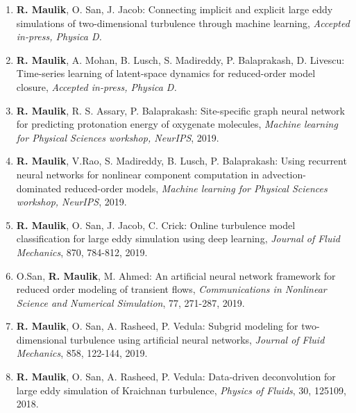 \documentclass[letterpaper]{article}
\begin{document}
\begin{enumerate}

\item \textbf{R. Maulik}, O. San, J. Jacob: Connecting implicit and explicit large eddy simulations of two-dimensional turbulence through machine learning, {\it Accepted in-press, Physica D.}

\item \textbf{R. Maulik}, A. Mohan, B. Lusch, S. Madireddy, P. Balaprakash, D. Livescu: Time-series learning of latent-space dynamics for reduced-order model closure, {\it Accepted in-press, Physica D.}

\item \textbf{R. Maulik}, R. S. Assary, P. Balaprakash: Site-specific graph neural network for predicting protonation energy of oxygenate molecules, {\it Machine learning for Physical Sciences workshop, NeurIPS}, 2019.

\item \textbf{R. Maulik}, V.Rao, S. Madireddy, B. Lusch, P. Balaprakash: Using recurrent neural networks for nonlinear component computation in advection-dominated reduced-order models, \textit{Machine learning for Physical Sciences workshop, NeurIPS}, 2019.


\item \textbf{R. Maulik}, O. San, J. Jacob, C. Crick: Online turbulence model classification for large eddy simulation using deep learning, {\it Journal of Fluid Mechanics}, 870, 784-812, 2019.

\item O.San, \textbf{R. Maulik}, M. Ahmed: An artificial neural network framework for reduced order modeling of transient flows, {\it Communications in Nonlinear Science and Numerical Simulation}, 77, 271-287, 2019.

\item \textbf{R. Maulik}, O. San, A. Rasheed, P. Vedula: Subgrid modeling for two-dimensional turbulence using artificial neural networks, {\it Journal of Fluid Mechanics}, 858, 122-144, 2019.

\item \textbf{R. Maulik}, O. San, A. Rasheed, P. Vedula: Data-driven deconvolution for large eddy simulation of Kraichnan turbulence, {\it Physics of Fluids}, 30, 125109, 2018.


\end{enumerate}
\end{document}
